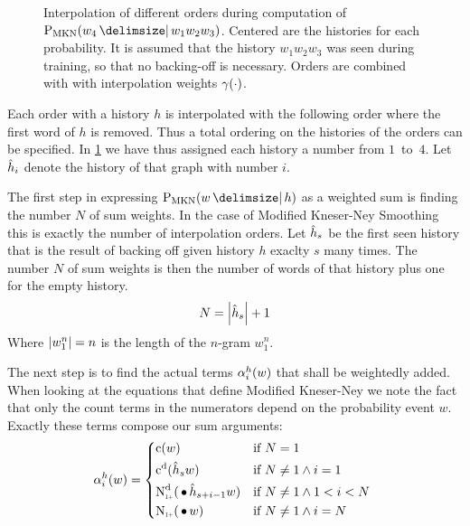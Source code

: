\begin{figure}[tb]
  \centering
  
  \caption{
    Interpolation of different orders during computation of
    $\ProbMKN{w_4}{w_1 w_2 w_3}$.
    Centered are the histories for each probability.
    It is assumed that the history $w_1 w_2 w_3$ was seen during training, so
    that no backing-off is necessary.
    Orders are combined with with interpolation weights $\gamma(\cdot)$.
  }
  \label{fig:history-mkn}
\end{figure}

Each order with a history $h$ is interpolated with the following order where
the first word of $h$ is removed.
Thus a total ordering on the histories of the orders can be specified.
In \cref{fig:history-mkn} we have thus assigned each history a number from
$1$~to~$4$.
Let $\DerivedHistory[i]$ denote the history of that graph with number $i$.

The first step in expressing $\ProbMKN{w}{h}$ as a weighted sum is finding the
number $N$ of sum weights.
In the case of Modified Kneser-Ney Smoothing this is exactly the number of
interpolation orders.
Let $\DerivedHistory[s]$ be the first seen history that is the result of
backing off given history $h$ exaclty $s$ many times.
The number $N$ of sum weights is then the number of words of that history plus
one for the empty history.
\begin{equation}
  N = \NGramLength{\DerivedHistory[s]} + 1
\end{equation}
Where ${\left|w_1^n\right|} = n$ is the length of the $n$-gram $w_1^n$.

The next step is to find the actual terms $\alpha_i^h(w)$ that shall be
weightedly added.
When looking at the equations that define Modified Kneser-Ney we note the fact
that only the count terms in the numerators depend on the probability event $w$.
Exactly these terms compose our sum arguments:
\begin{equation}
  \SumArg_i^h(w) =
    \begin{dcases*}
      \Count(w)                                             & if $N = 1$ \\
      \DiscountedCount(\DerivedHistory[s] w)                & if $N \neq 1 \land i = 1$ \\
      \DiscountedCount*(\WSkp \DerivedHistory[s + i - 1] w) & if $N \neq 1 \land 1 < i < N$ \\
      \ContCountIp(\WSkp w)                                 & if $N \neq 1 \land i = N$
    \end{dcases*}
\end{equation}

